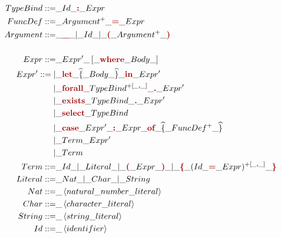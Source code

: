 {\begin{implementationfr}
{\begin{align*}
\\
TypeBind ::=& \_ Id \_ \lt{:} \_ Expr
\\
FuncDef ::=& \_ \list{Argument} \_ \lt{=} \_ Expr
\\
Argument ::=
    & \_ \lt{\textunderscore} \_ | \_ Id \_ | \_ \parens{\list{Argument}}
\\
\\
Expr ::=& \_ Expr' \_ \maybe{\lt{where} \_ Body}
\\
Expr' ::=
    |& \_ \lt{let} \_ \scope{Body} \_ \lt{in} \_ Expr'
\\
    |& \_ \lt{forall} \_ \listSep{TypeBind}{\lt{,}} \_ \lt{.} \_ Expr'
\\
    |& \_ \lt{exists} \_ TypeBind \_ \lt{.} \_ Expr'
\\
    |& \_ \lt{select} \_ TypeBind
\\
    |& \_ \lt{case} \_ Expr' \_ \lt{:} \_ Expr \_ \lt{of} \_
        \scope{\list{FuncDef}}
\\
    |& \_ Term \_ Expr'
\\
    |& \_ Term
\\
Term ::=
    & \_ Id \_ | \_ Literal \_ | \_ \parens{Expr} \_
    | \_ \lt{\{} \_ \listSep{(Id \_ \lt{=} \_ Expr)}{\lt{,}} \_ \lt{\}}
\\
Literal ::=& \_ Nat \_ | \_ Char \_ | \_ String
\\
Nat ::=& \_ \left<natural \_ number \_ literal\right>
\\
Char ::=& \_ \left<character \_ literal\right>
\\
String ::=& \_ \left<string \_ literal\right>
\\
Id ::=& \_ \left<identifier\right>
\end{align*}
\label{fig:parser-grammar}
}


\end{implementationfr}}
